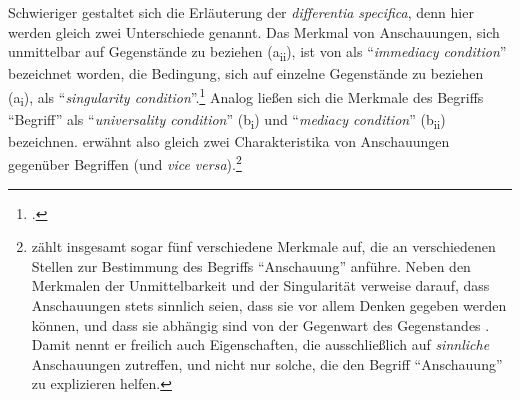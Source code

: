 Schwieriger gestaltet sich die Erläuterung der \emph{differentia specifica},
denn hier werden gleich zwei Unterschiede genannt. Das Merkmal von Anschauungen, sich unmittelbar
auf Gegenstände zu beziehen (a\textsubscript{ii}), ist von
 als \enquote{\emph{immediacy condition}} bezeichnet worden, die
Bedingung, sich auf einzelne Gegenstände zu beziehen (a\textsubscript{i}), als
\enquote{\emph{singularity condition}}.\footnote{\cite[Vgl.][\pno~43\,f.]{Parsons:KantsPhilosophyofArithmetic1992}.}
Analog ließen sich die Merkmale des Begriffs \enquote{Begriff} als
\enquote{\emph{universality condition}} (b\textsubscript{i}) und
\enquote{\emph{mediacy condition}} (b\textsubscript{ii}) bezeichnen.
 erwähnt also gleich zwei Charakteristika von
Anschauungen gegenüber Begriffen (und \emph{vice versa}).\footnote{
zählt insgesamt sogar fünf verschiedene Merkmale auf, die 
an verschiedenen Stellen zur Bestimmung des Begriffs \enquote{Anschauung}
anführe. Neben den Merkmalen der Unmittelbarkeit und der Singularität verweise
 darauf, dass Anschauungen stets sinnlich seien, dass sie
vor allem Denken gegeben werden können, und dass sie abhängig sind von der
Gegenwart des Gegenstandes
\parencite[Vgl.][195]{Hanna:KantandtheFoundationsofAnalyticPhilosophy2001}.
Damit nennt er freilich auch Eigenschaften, die ausschließlich auf
\emph{sinnliche} Anschauungen zutreffen, und nicht nur solche, die den Begriff
\enquote{Anschauung} zu explizieren helfen.}

